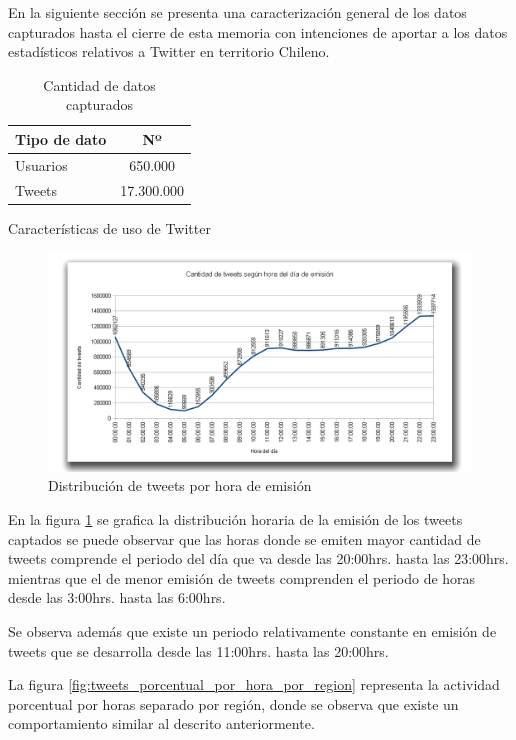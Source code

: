 En la siguiente sección se presenta una caracterización general de los datos capturados hasta el cierre de esta memoria con intenciones de aportar a los datos estadísticos relativos a Twitter en territorio Chileno.

\begin{table}[H]
	\centering
	\begin{tabular}{| l | c |}
		\hline
		Tipo de dato    & Nº\\ \hline
		Usuarios    & 650.000 \\ \hline
		Tweets		& 17.300.000 \\ \hline
	\end{tabular}
	\caption {Cantidad de datos capturados}
\end{table}

Características de uso de Twitter 

\begin{figure}[H]
	\centering
	\includegraphics[width=1\textwidth]{imgs/tweets_por_hora_del_dia.png}
	\caption{Distribución de tweets por hora de emisión}
	\label{fig:tweets_por_hora}
\end{figure}

En la figura \ref{fig:tweets_por_hora} se grafica la distribución horaria de la emisión de los tweets captados se puede observar que las horas donde se emiten mayor cantidad de tweets comprende el periodo del día que va desde las 20:00hrs. hasta las 23:00hrs. mientras que el de menor emisión de tweets comprenden el periodo de horas desde las 3:00hrs. hasta las 6:00hrs. 

Se observa además que existe un periodo relativamente constante en emisión de tweets que se desarrolla desde las 11:00hrs. hasta las 20:00hrs.

La figura \ref{fig:tweets_porcentual_por_hora_por_region} representa la actividad porcentual por horas separado por región, donde se observa que existe un comportamiento similar al descrito anteriormente.


